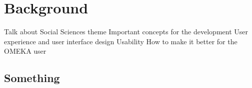 
%

\chapter{Background}
\label{cha:background}

Talk about Social Sciences theme
Important concepts for the development
User experience and user interface design
Usability
How to make it better for the OMEKA user


\section{Something}
\label{sec:something}


